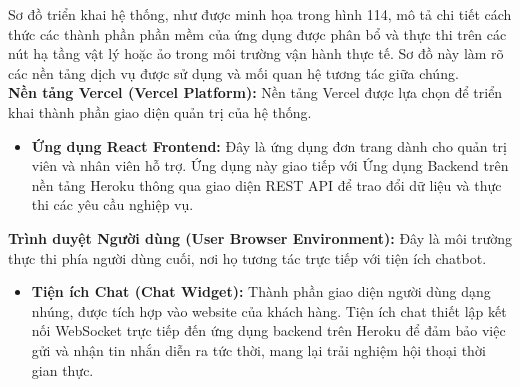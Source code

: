 \begin{figure}[H]
    \thispagestyle{empty}
    \centering
\end{figure}

Sơ đồ triển khai hệ thống, như được minh họa trong hình 114, mô tả chi tiết cách thức các thành phần phần mềm của ứng dụng được phân bổ và thực thi trên các nút hạ tầng vật lý hoặc ảo trong môi trường vận hành thực tế. Sơ đồ này làm rõ các nền tảng dịch vụ được sử dụng và mối quan hệ tương tác giữa chúng. \\

\textbf{Nền tảng Vercel (Vercel Platform):} Nền tảng Vercel được lựa chọn để triển khai thành phần giao diện quản trị của hệ thống.
\begin{itemize}
    \item \textbf{Ứng dụng React Frontend:} Đây là ứng dụng đơn trang dành cho quản trị viên và nhân viên hỗ trợ. Ứng dụng này giao tiếp với Ứng dụng Backend trên nền tảng Heroku thông qua giao diện REST API để trao đổi dữ liệu và thực thi các yêu cầu nghiệp vụ.
\end{itemize}

\textbf{Trình duyệt Người dùng (User Browser Environment):} Đây là môi trường thực thi phía người dùng cuối, nơi họ tương tác trực tiếp với tiện ích chatbot.
\begin{itemize}
    \item \textbf{Tiện ích Chat (Chat Widget):} Thành phần giao diện người dùng dạng nhúng, được tích hợp vào website của khách hàng. Tiện ích chat thiết lập kết nối WebSocket trực tiếp đến ứng dụng backend trên Heroku để đảm bảo việc gửi và nhận tin nhắn diễn ra tức thời, mang lại trải nghiệm hội thoại thời gian thực.
\end{itemize}

